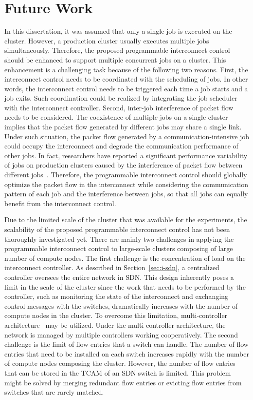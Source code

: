 \section{Future Work}

In this dissertation, it was assumed that only a single job is executed on the
cluster. However, a production cluster usually executes multiple jobs
simultaneously. Therefore, the proposed programmable interconnect control
should be enhanced to support multiple concurrent jobs on a cluster. This
enhancement is a challenging task because of the following two reasons. First,
the interconnect control needs to be coordinated with the scheduling of jobs.
In other words, the interconnect control needs to be triggered each time a job
starts and a job exits. Such coordination could be realized by integrating the
job scheduler with the interconnect controller. Second, inter-job interference
of packet flow needs to be considered. The coexistence of multiple jobs on a
single cluster implies that the packet flow generated by different jobs may
share a single link. Under such situation, the packet flow generated by a
communication-intensive job could occupy the interconnect and degrade the
communication performance of other jobs. In fact, researchers have reported a
significant performance variability of jobs on production clusters caused by
the interference of packet flow between different jobs~\cite{Bhatele2013}.
Therefore, the programmable interconnect control should globally optimize the
packet flow in the interconnect while considering the communication pattern of
each job and the interference between jobs, so that all jobs can equally
benefit from the interconnect control.

Due to the limited scale of the cluster that was available for the
experiments, the scalability of the proposed programmable interconnect control
has not been thoroughly investigated yet. There are mainly two challenges in
applying the programmable interconnect control to large-scale clusters
composing of large number of compute nodes. The first challenge is the
concentration of load on the interconnect controller. As described in
Section~\ref{sec:i-sdn}, a centralized controller oversees the entire network
in SDN\@. This design inherently poses a limit in the scale of the cluster
since the work that needs to be performed by the controller, such as
monitoring the state of the interconnect and exchanging control messages with
the switches, dramatically increases with the number of compute nodes in the
cluster. To overcome this limitation, multi-controller
architecture~\cite{Hu2018} may be utilized. Under the multi-controller
architecture, the network is managed by multiple controllers working
cooperatively. The second challenge is the limit of flow entries that a switch
can handle. The number of flow entries that need to be installed on each
switch increases rapidly with the number of compute nodes composing the
cluster.  However, the number of flow entries that can be stored in the TCAM
of an SDN switch is limited. This problem might be solved by merging redundant
flow entries or evicting flow entries from switches that are rarely matched.
